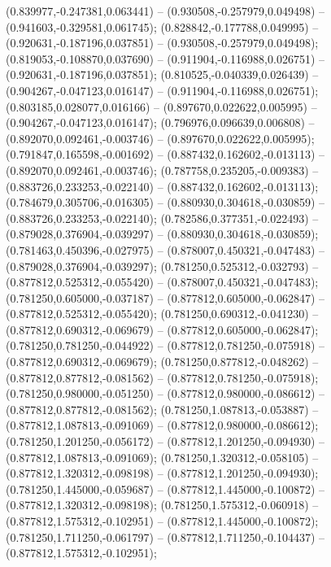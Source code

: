  (0.839977,-0.247381,0.063441) -- (0.930508,-0.257979,0.049498) -- (0.941603,-0.329581,0.061745);
 (0.828842,-0.177788,0.049995) -- (0.920631,-0.187196,0.037851) -- (0.930508,-0.257979,0.049498);
 (0.819053,-0.108870,0.037690) -- (0.911904,-0.116988,0.026751) -- (0.920631,-0.187196,0.037851);
 (0.810525,-0.040339,0.026439) -- (0.904267,-0.047123,0.016147) -- (0.911904,-0.116988,0.026751);
 (0.803185,0.028077,0.016166) -- (0.897670,0.022622,0.005995) -- (0.904267,-0.047123,0.016147);
 (0.796976,0.096639,0.006808) -- (0.892070,0.092461,-0.003746) -- (0.897670,0.022622,0.005995);
 (0.791847,0.165598,-0.001692) -- (0.887432,0.162602,-0.013113) -- (0.892070,0.092461,-0.003746);
 (0.787758,0.235205,-0.009383) -- (0.883726,0.233253,-0.022140) -- (0.887432,0.162602,-0.013113);
 (0.784679,0.305706,-0.016305) -- (0.880930,0.304618,-0.030859) -- (0.883726,0.233253,-0.022140);
 (0.782586,0.377351,-0.022493) -- (0.879028,0.376904,-0.039297) -- (0.880930,0.304618,-0.030859);
 (0.781463,0.450396,-0.027975) -- (0.878007,0.450321,-0.047483) -- (0.879028,0.376904,-0.039297);
 (0.781250,0.525312,-0.032793) -- (0.877812,0.525312,-0.055420) -- (0.878007,0.450321,-0.047483);
 (0.781250,0.605000,-0.037187) -- (0.877812,0.605000,-0.062847) -- (0.877812,0.525312,-0.055420);
 (0.781250,0.690312,-0.041230) -- (0.877812,0.690312,-0.069679) -- (0.877812,0.605000,-0.062847);
 (0.781250,0.781250,-0.044922) -- (0.877812,0.781250,-0.075918) -- (0.877812,0.690312,-0.069679);
 (0.781250,0.877812,-0.048262) -- (0.877812,0.877812,-0.081562) -- (0.877812,0.781250,-0.075918);
 (0.781250,0.980000,-0.051250) -- (0.877812,0.980000,-0.086612) -- (0.877812,0.877812,-0.081562);
 (0.781250,1.087813,-0.053887) -- (0.877812,1.087813,-0.091069) -- (0.877812,0.980000,-0.086612);
 (0.781250,1.201250,-0.056172) -- (0.877812,1.201250,-0.094930) -- (0.877812,1.087813,-0.091069);
 (0.781250,1.320312,-0.058105) -- (0.877812,1.320312,-0.098198) -- (0.877812,1.201250,-0.094930);
 (0.781250,1.445000,-0.059687) -- (0.877812,1.445000,-0.100872) -- (0.877812,1.320312,-0.098198);
 (0.781250,1.575312,-0.060918) -- (0.877812,1.575312,-0.102951) -- (0.877812,1.445000,-0.100872);
 (0.781250,1.711250,-0.061797) -- (0.877812,1.711250,-0.104437) -- (0.877812,1.575312,-0.102951);
